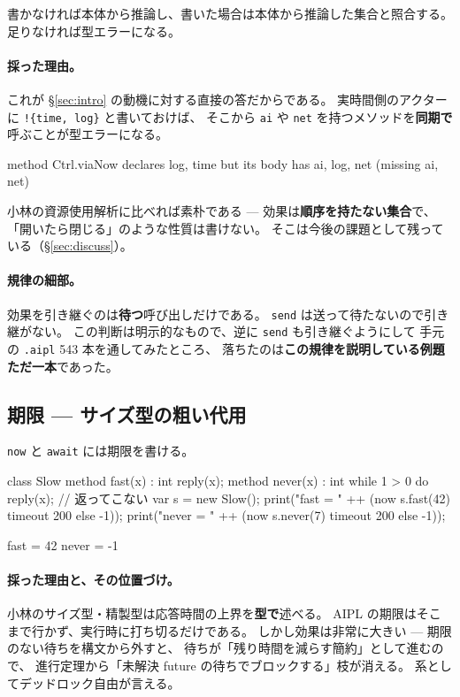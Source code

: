 \documentclass[11pt,a4paper]{ltjsarticle}
\theoremstyle{definition}
\theoremstyle{remark}
\begin{document}
書かなければ本体から推論し、書いた場合は本体から推論した集合と照合する。
足りなければ型エラーになる。

\paragraph{採った理由。}
これが \S\ref{sec:intro} の動機に対する直接の答だからである。
実時間側のアクターに \texttt{!\{time, log\}} と書いておけば、
そこから \texttt{ai} や \texttt{net} を持つメソッドを\textbf{同期で}呼ぶことが型エラーになる。

\begin{term}
 method Ctrl.viaNow declares {log, time}
             but its body has {ai, log, net} (missing {ai, net})
\end{term}

小林の資源使用解析に比べれば素朴である --- 効果は\textbf{順序を持たない集合}で、
「開いたら閉じる」のような性質は書けない。
そこは今後の課題として残っている（\S\ref{sec:discuss}）。

\paragraph{規律の細部。}
効果を引き継ぐのは\textbf{待つ}呼び出しだけである。
\texttt{send} は送って待たないので引き継がない。
この判断は明示的なもので、逆に \texttt{send} も引き継ぐようにして
手元の \texttt{.aipl} 543 本を通してみたところ、
落ちたのは\textbf{この規律を説明している例題ただ一本}であった。

\subsection{期限 --- サイズ型の粗い代用}
\label{sec:deadline}

\texttt{now} と \texttt{await} には期限を書ける。

\begin{aipl}
class Slow {
  method fast(x) : int { reply(x); }
  method never(x) : int { while 1 > 0 do { } reply(x); }   // 返ってこない
}
var s = new Slow();
print("fast  = " ++ (now s.fast(42) timeout 200 else -1));
print("never = " ++ (now s.never(7) timeout 200 else -1));
\end{aipl}
\begin{term}
fast  = 42
never = -1
\end{term}

\paragraph{採った理由と、その位置づけ。}
小林のサイズ型・精製型は応答時間の上界を\textbf{型で}述べる。
AIPL の期限はそこまで行かず、実行時に打ち切るだけである。
しかし効果は非常に大きい --- 期限のない待ちを構文から外すと、
待ちが「残り時間を減らす簡約」として進むので、
進行定理から「未解決 future の待ちでブロックする」枝が消える。
系としてデッドロック自由が言える。
\end{document}
